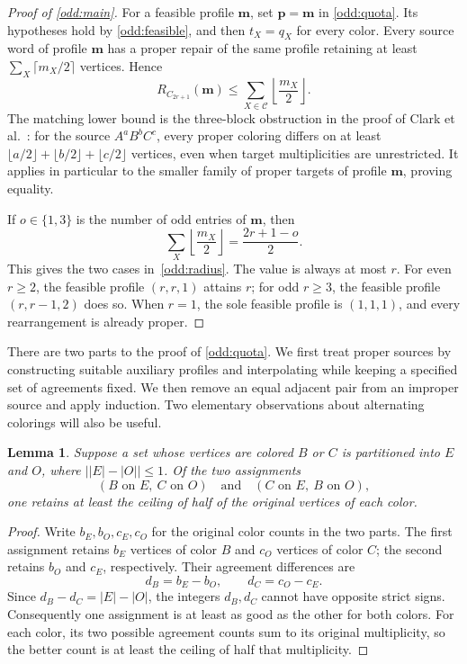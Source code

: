\documentclass[10pt,a4paper]{amsart}
\numberwithin{equation}{section}
\newtheorem{lemma}[theorem]{Lemma}
\theoremstyle{definition}
\theoremstyle{remark}
\begin{document}
\begin{proof}[Proof of \cref{odd:main}]
For a feasible profile $\mathbf m$, set $\mathbf p=\mathbf m$ in
\cref{odd:quota}. Its hypotheses hold by
\cref{odd:feasible}, and then $t_X=q_X$ for every color.
Every source word of profile $\mathbf m$
has a proper repair of the same profile retaining at least
$\sum_X\lceil m_X/2\rceil$ vertices. Hence
\[
R_{C_{2r+1}}(\mathbf m)
\le\sum_{X\in\mathcal C}\left\lfloor\frac{m_X}{2}\right\rfloor.
\]
The matching lower bound is the three-block obstruction in the proof
of Clark et al.~\cite[Proposition~3.5]{clark2006}: for the source
$A^aB^bC^c$, every proper coloring differs on at least
$\lfloor a/2\rfloor+\lfloor b/2\rfloor+\lfloor c/2\rfloor$
vertices, even when target multiplicities are unrestricted.
It applies in particular to the smaller family of proper targets of
profile $\mathbf m$, proving equality.

If $o\in\{1,3\}$ is the number of odd entries of $\mathbf m$, then
\[
\sum_X\left\lfloor\frac{m_X}{2}\right\rfloor
=\frac{2r+1-o}{2}.
\]
This gives the two cases in~\eqref{odd:radius}. The value is always
at most $r$. For even $r\ge2$, the feasible profile $(r,r,1)$ attains
$r$; for odd $r\ge3$, the feasible profile $(r,r-1,2)$ does so.
When $r=1$, the sole feasible profile is $(1,1,1)$, and every
rearrangement is already proper.
\end{proof}

There are two parts to the proof of \cref{odd:quota}. We first treat proper sources by
constructing suitable auxiliary profiles and interpolating while keeping
a specified set of agreements fixed. We then remove an equal adjacent
pair from an improper source and apply induction. Two elementary
observations about alternating colorings will also be useful.

\begin{lemma}\label{odd:binary}
Suppose a set whose vertices are colored $B$ or $C$ is partitioned
into $E$ and $O$, where $\bigl||E|-|O|\bigr|\le1$.
Of the two assignments
\[
(B\text{ on }E,\ C\text{ on }O)
\quad\text{and}\quad
(C\text{ on }E,\ B\text{ on }O),
\]
one retains at least the ceiling of half of the original vertices of
each color.
\end{lemma}
\begin{proof}
Write $b_E,b_O,c_E,c_O$ for the original color counts in the two
parts. The first assignment retains $b_E$ vertices of color $B$ and
$c_O$ vertices of color $C$; the second retains $b_O$ and $c_E$,
respectively. Their agreement differences are
\[
d_B=b_E-b_O,\qquad d_C=c_O-c_E.
\]
Since $d_B-d_C=|E|-|O|$, the integers $d_B,d_C$ cannot have opposite
strict signs. Consequently one assignment is at least as good as the
other for both colors. For each color, its two possible agreement
counts sum to its original multiplicity, so the better count is at
least the ceiling of half that multiplicity.
\end{proof}
\end{document}
